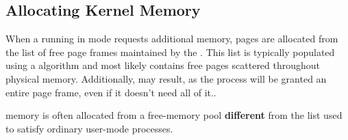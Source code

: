 \subsection{Allocating Kernel Memory}\label{subsec:Allocating_Kernel_Memory}
When a  running in  mode requests additional memory, pages are allocated from the list of free page frames maintained by the .
This list is typically populated using a  algorithm and most likely contains free pages scattered throughout physical memory.
Additionally,  may result, as the process will be granted an entire page frame, even if it doesn't need all of it..

 memory is often allocated from a free-memory pool \textbf{different} from the list used to satisfy ordinary user-mode processes.

